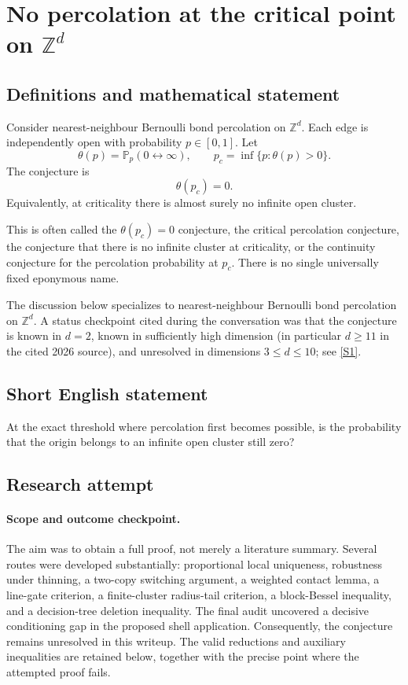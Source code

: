 \documentclass[11pt]{article}
\begin{document}
\section*{\texorpdfstring{No percolation at the critical point on $\mathbb{Z}^d$}{No percolation at the critical point on \$\textbackslash{}mathbb\{Z\}\textasciicircum{}d\$}}\label{critical-percolation}\label{statement}

\subsection{Definitions and mathematical statement}
Consider nearest-neighbour Bernoulli bond percolation on \(\mathbb Z^d\). Each edge is independently open with probability \(p\in[0,1]\). Let
\[
\theta(p)=\mathbb P_p(0\leftrightarrow\infty),
\qquad
p_c=\inf\{p:\theta(p)>0\}.
\]
The conjecture is
\[
\boxed{\theta(p_c)=0.}
\]
Equivalently, at criticality there is almost surely no infinite open cluster.

This is often called the \(\theta(p_c)=0\) conjecture, the critical percolation conjecture, the conjecture that there is no infinite cluster at criticality, or the continuity conjecture for the percolation probability at \(p_c\). There is no single universally fixed eponymous name.

The discussion below specializes to nearest-neighbour Bernoulli bond percolation on \(\mathbb Z^d\). A status checkpoint cited during the conversation was that the conjecture is known in \(d=2\), known in sufficiently high dimension (in particular \(d\ge 11\) in the cited 2026 source), and unresolved in dimensions \(3\le d\le10\); see \href{https://arxiv.org/html/2608.23661v1}{[S1]}.

\subsection{Short English statement}
At the exact threshold where percolation first becomes possible, is the probability that the origin belongs to an infinite open cluster still zero?

\subsection{Research attempt}

\paragraph{Scope and outcome checkpoint.}
The aim was to obtain a full proof, not merely a literature summary. Several routes were developed substantially: proportional local uniqueness, robustness under thinning, a two-copy switching argument, a weighted contact lemma, a line-gate criterion, a finite-cluster radius-tail criterion, a block-Bessel inequality, and a decision-tree deletion inequality. The final audit uncovered a decisive conditioning gap in the proposed shell application. Consequently, the conjecture remains unresolved in this writeup. The valid reductions and auxiliary inequalities are retained below, together with the precise point where the attempted proof fails.
\end{document}
